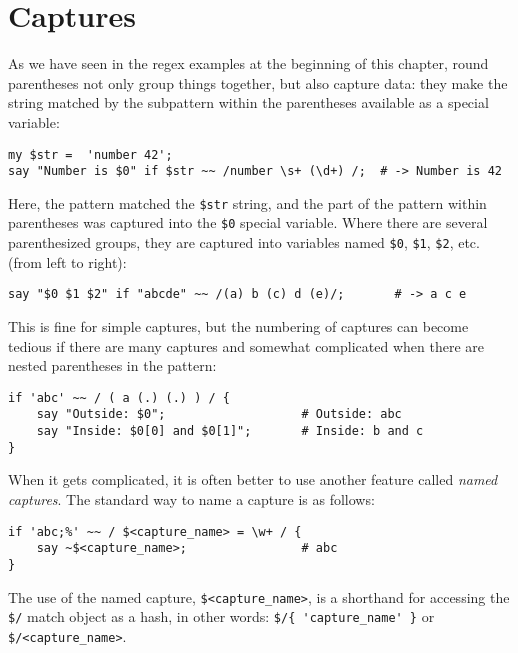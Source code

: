 \section{Captures}

As we have seen in the regex examples at the beginning 
of this chapter, round parentheses 
not only group things together, but also capture data: they 
make the string matched by the subpattern within 
the parentheses available as a special variable:

\begin{verbatim}
my $str =  'number 42';
say "Number is $0" if $str ~~ /number \s+ (\d+) /;  # -> Number is 42
\end{verbatim}
%

Here, the pattern matched the \verb'$str' string, and the 
part of the pattern within parentheses was captured into 
the \verb'$0' special variable. Where there are several 
parenthesized groups, they are captured into variables 
named \verb'$0', \verb'$1',  \verb'$2', etc. (from 
left to right):

\begin{verbatim}
say "$0 $1 $2" if "abcde" ~~ /(a) b (c) d (e)/;       # -> a c e
\end{verbatim}
%

This is fine for simple captures, but the numbering of 
captures can become tedious if there are many captures and 
somewhat complicated when there are nested parentheses in 
the pattern:

\begin{verbatim}
if 'abc' ~~ / ( a (.) (.) ) / {
    say "Outside: $0";                   # Outside: abc
    say "Inside: $0[0] and $0[1]";       # Inside: b and c
}
\end{verbatim}

When it gets complicated, it is often better to use another 
feature called \emph{named captures}. The standard way to 
name a capture is as follows:

\begin{verbatim}
if 'abc;%' ~~ / $<capture_name> = \w+ / {
    say ~$<capture_name>;                # abc
}
\end{verbatim} 

The use of the named capture, \verb'$<capture_name>', 
is a shorthand for accessing the \verb'$/' match object as 
a hash, in other words: \verb"$/{ 'capture_name' }" or 
\verb'$/<capture_name>'.

